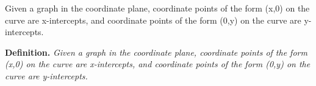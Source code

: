 \documentclass{article}
\begin{document}
\begin{theo}
Given a graph in the coordinate plane, 
coordinate points of the form (x,0) on the curve are x-intercepts,
 and coordinate points of the form (0,y) on the curve are y-intercepts.
\end{theo}

\begin{tcolorbox}[
    width=\linewidth,
    colframe=black,         %
    colback=white,          %
    boxrule=0.5pt,          %
    left=1mm, right=1mm,    %
    top=1mm, bottom=1mm,    %
    arc=2mm                 %
]
\textbf{Definition.} \textit{Given a graph in the coordinate plane, coordinate points of the form (x,0) on the curve are x-intercepts, and coordinate points of the form (0,y) on the curve are y-intercepts.}
\end{tcolorbox}
\end{document}
